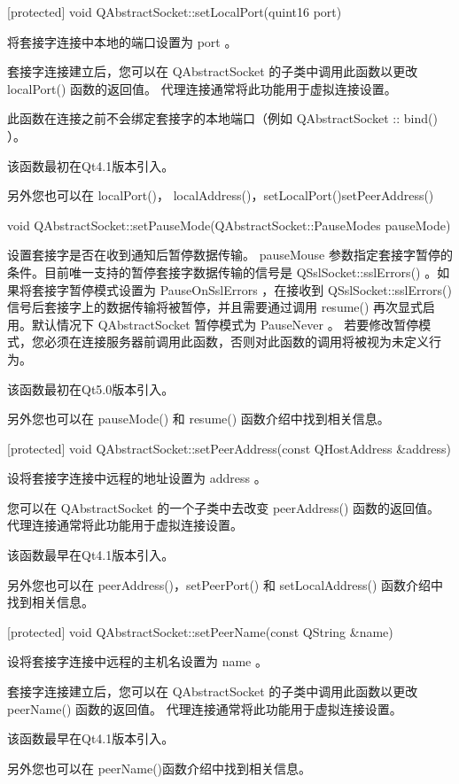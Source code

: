 [protected] void QAbstractSocket::setLocalPort(quint16 port)

将套接字连接中本地的端口设置为 port 。

套接字连接建立后，您可以在 QAbstractSocket 的子类中调用此函数以更改 localPort() 函数的返回值。 代理连接通常将此功能用于虚拟连接设置。

\begin{notice}
此函数在连接之前不会绑定套接字的本地端口（例如 QAbstractSocket :: bind() ）。
\end{notice}

该函数最初在Qt4.1版本引入。

另外您也可以在 localPort()， localAddress()，setLocalPort()setPeerAddress()

void QAbstractSocket::setPauseMode(QAbstractSocket::PauseModes
pauseMode)

设置套接字是否在收到通知后暂停数据传输。 pauseMouse 参数指定套接字暂停的条件。目前唯一支持的暂停套接字数据传输的信号是 QSslSocket::sslErrors() 。如果将套接字暂停模式设置为 PauseOnSslErrors ，在接收到 QSslSocket::sslErrors() 信号后套接字上的数据传输将被暂停，并且需要通过调用 resume() 再次显式启用。默认情况下 QAbstractSocket 暂停模式为 PauseNever 。 若要修改暂停模式，您必须在连接服务器前调用此函数，否则对此函数的调用将被视为未定义行为。

该函数最初在Qt5.0版本引入。

另外您也可以在 pauseMode() 和 resume() 函数介绍中找到相关信息。

[protected] void QAbstractSocket::setPeerAddress(const QHostAddress
\&address)

设将套接字连接中远程的地址设置为 address 。

您可以在 QAbstractSocket 的一个子类中去改变 peerAddress() 函数的返回值。 代理连接通常将此功能用于虚拟连接设置。

该函数最早在Qt4.1版本引入。

另外您也可以在 peerAddress()，setPeerPort() 和 setLocalAddress() 函数介绍中找到相关信息。

[protected] void QAbstractSocket::setPeerName(const QString \&name)

设将套接字连接中远程的主机名设置为 name 。

套接字连接建立后，您可以在 QAbstractSocket 的子类中调用此函数以更改 peerName() 函数的返回值。 代理连接通常将此功能用于虚拟连接设置。

该函数最早在Qt4.1版本引入。

另外您也可以在 peerName()函数介绍中找到相关信息。

